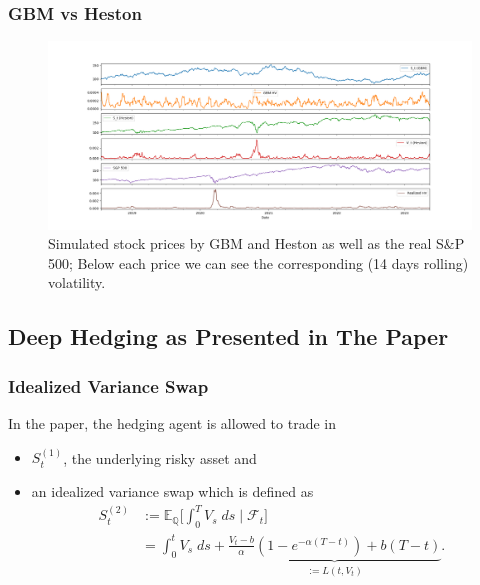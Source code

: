 \documentclass[serif]{beamer}
\def\E{{\mathbb E}}
\def\cF{{\mathcal F}}
\begin{document}
\begin{frame}[t]
    \frametitle{GBM vs Heston}
    \begin{figure}[t]
        \centering
        \includegraphics[width=1.0\textwidth]{./images/gbm_heston_example.png}
        \caption{
            Simulated stock prices by GBM and Heston as well as the real S\&P 500;
            Below each price we can see the corresponding (14 days rolling) volatility.
        }
    \end{figure}
\end{frame}

\subsection{Deep Hedging as Presented in The Paper}

\begin{frame}
    \frametitle{Idealized Variance Swap}
    In the paper, the hedging agent is allowed to trade in
    \begin{itemize}
        \item $S^{(1)}_t$, the underlying risky asset and
        \item an idealized variance swap which is defined as
              \begin{align*}
                  S^{(2)}_t & := \E_{\mathbb{Q}} \Big [
                      \int_0^T V_s \; ds \; \Big | \; \cF_t
                  \Big ]                                \\
                            & = \int_0^t V_s \; ds
                  + \underbrace{
                      \frac{V_t - b}{\alpha} (
                      1 - e^{-\alpha(T-t)}
                      ) + b(T-t)
                  }_{:= L(t, V_t)}.
              \end{align*}
    \end{itemize}
\end{frame}
\end{document}
